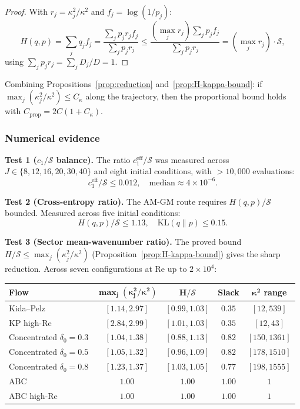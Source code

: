 \documentclass[11pt]{article}
\theoremstyle{definition}
\newcommand{\cS}{\mathcal{S}}
\begin{document}
\begin{proof}
With $r_j = \kappa_j^2/\kappa^2$ and $f_j = \log(1/p_j)$:
\begin{equation}
H(q,p) = \sum_j q_j f_j
= \frac{\sum_j p_j r_j f_j}{\sum_j p_j r_j}
\leq \frac{(\max_j r_j)\sum_j p_j f_j}{\sum_j p_j r_j}
= (\max_j r_j)\cdot\cS,
\end{equation}
using $\sum_j p_j r_j = \sum_j D_j/D = 1$.
\end{proof}

Combining Propositions~\ref{prop:reduction}
and~\ref{prop:H-kappa-bound}: if
$\max_j(\kappa_j^2/\kappa^2) \leq C_\kappa$ along
the trajectory, then the proportional bound holds with
$C_{\mathrm{prop}} = 2C(1 + C_\kappa)$.


\subsubsection{Numerical evidence}

\noindent\textbf{Test 1 ($c_1/\cS$ balance).}
The ratio $c_1^{\mathrm{eff}}/\cS$ was measured across
$J \in \{8,12,16,20,30,40\}$ and eight initial conditions,
with $> 10{,}000$ evaluations:
\begin{equation}
c_1^{\mathrm{eff}}/\cS \leq 0.012,
\quad\text{median} \approx 4\times 10^{-6}.
\end{equation}

\noindent\textbf{Test 2 (Cross-entropy ratio).}
The AM-GM route requires $H(q,p)/\cS$ bounded.
Measured across five initial conditions:
\begin{equation}
H(q,p)/\cS \leq 1.13,
\quad\mathrm{KL}(q\|p) \leq 0.15.
\end{equation}

\noindent\textbf{Test 3 (Sector mean-wavenumber ratio).}
The proved bound $H/\cS \leq \max_j(\kappa_j^2/\kappa^2)$
(Proposition~\ref{prop:H-kappa-bound}) gives the sharp
reduction.  Across seven configurations at
$\mathrm{Re}$ up to $2\times10^4$:
\begin{center}
\begin{tabular}{lcccc}
\toprule
\textbf{Flow} & $\boldsymbol{\max_j(\kappa_j^2/\kappa^2)}$
& $\boldsymbol{H/\cS}$ & \textbf{Slack}
& $\boldsymbol{\kappa^2}$ \textbf{range}\\
\midrule
Kida--Pelz & $[1.14, 2.97]$ & $[0.99, 1.03]$ & $0.35$
& $[12, 539]$ \\
KP high-Re & $[2.84, 2.99]$ & $[1.01, 1.03]$ & $0.35$
& $[12, 43]$ \\
Concentrated $\delta_0\!=\!0.3$ & $[1.04, 1.38]$
& $[0.88, 1.13]$ & $0.82$ & $[150, 1361]$ \\
Concentrated $\delta_0\!=\!0.5$ & $[1.05, 1.32]$
& $[0.96, 1.09]$ & $0.82$ & $[178, 1510]$ \\
Concentrated $\delta_0\!=\!0.8$ & $[1.23, 1.37]$
& $[1.03, 1.05]$ & $0.77$ & $[198, 1555]$ \\
ABC & $1.00$ & $1.00$ & $1.00$ & $1$ \\
ABC high-Re & $1.00$ & $1.00$ & $1.00$ & $1$ \\
\bottomrule
\end{tabular}
\end{center}
\end{document}
